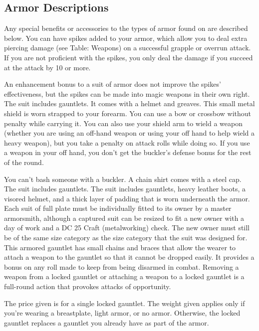 \subsection{Armor Descriptions}
Any special benefits or accessories to the types of armor found on  are described below.
 You can have spikes added to your armor, which allow you to deal extra piercing damage (see Table: Weapons) on a successful grapple or overrun attack. If you are not proficient with the spikes, you only deal the damage if you succeed at the attack by 10 or more.
\par An enhancement bonus to a suit of armor does not improve the spikes' effectiveness, but the spikes can be made into magic weapons in their own right.
 The suit includes gauntlets.
 It comes with a helmet and greaves.
 This small metal shield is worn strapped to your forearm. You can use a bow or crossbow without penalty while carrying it. You can also use your shield arm to wield a weapon (whether you are using an off-hand weapon or using your off hand to help wield a heavy weapon), but you take a  penalty on attack rolls while doing so. If you use a weapon in your off hand, you don't get the buckler's defense bonus for the rest of the round.
\par You can't bash someone with a buckler.
 A chain shirt comes with a steel cap.
 The suit includes gauntlets.
 The suit includes gauntlets, heavy leather boots, a visored helmet, and a thick layer of padding that is worn underneath the armor. Each suit of full plate must be individually fitted to its owner by a master armorsmith, although a captured suit can be resized to fit a new owner with a day of work and a DC 25 Craft (metalworking) check. The new owner must still be of the same size category as the size category that the suit was designed for.
 This armored gauntlet has small chains and braces that allow the wearer to attach a weapon to the gauntlet so that it cannot be dropped easily. It provides a  bonus on any roll made to keep from being disarmed in combat. Removing a weapon from a locked gauntlet or attaching a weapon to a locked gauntlet is a full-round action that provokes attacks of opportunity.
\par The price given is for a single locked gauntlet. The weight given applies only if you're wearing a breastplate, light armor, or no armor. Otherwise, the locked gauntlet replaces a gauntlet you already have as part of the armor.
